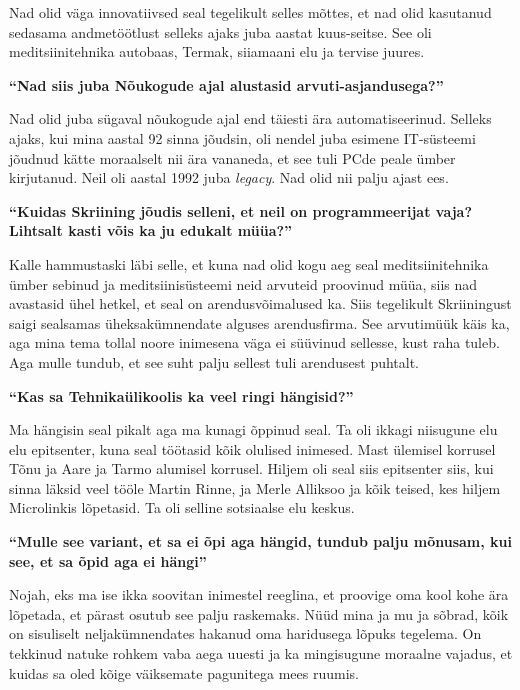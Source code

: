 Nad olid väga innovatiivsed seal tegelikult selles mõttes, et nad olid 
kasutanud sedasama andmetöötlust selleks ajaks juba aastat kuus-seitse. See oli 
 meditsiinitehnika autobaas, Termak, siiamaani elu ja tervise 
juures. 


\textbf{\enquote{Nad siis juba Nõukogude ajal alustasid arvuti-asjandusega?}}

Nad olid juba sügaval nõukogude ajal end täiesti ära automatiseerinud. Selleks 
ajaks, kui mina aastal 92 sinna jõudsin, oli nendel juba esimene IT-süsteemi 
jõudnud kätte moraalselt nii ära vananeda, et see tuli PCde peale ümber 
kirjutanud. Neil oli aastal 1992 juba \emph{legacy}. Nad olid nii palju ajast 
ees.


\textbf{\enquote{Kuidas Skriining jõudis selleni, et neil on programmeerijat 
vaja? Lihtsalt kasti võis ka ju edukalt müüa?}}

Kalle hammustaski läbi selle, et kuna nad olid kogu 
aeg seal meditsiinitehnika ümber sebinud ja meditsiinisüsteemi neid arvuteid 
proovinud müüa, siis nad avastasid ühel hetkel, et seal on arendusvõimalused 
ka. Siis tegelikult Skriiningust saigi sealsamas 
üheksakümnendate alguses  arendusfirma. See arvutimüük käis ka, aga mina tema 
tollal noore inimesena väga ei süüvinud sellesse, kust raha tuleb. Aga mulle 
tundub, et see suht palju sellest tuli arendusest puhtalt.


\textbf{\enquote{Kas sa Tehnikaülikoolis ka veel ringi hängisid?}}

Ma hängisin seal pikalt aga ma kunagi õppinud seal. Ta oli ikkagi niisugune elu 
elu epitsenter, kuna seal töötasid kõik olulised inimesed. 
Mast ülemisel korrusel Tõnu ja 
Aare ja Tarmo alumisel 
korrusel. Hiljem oli seal siis epitsenter siis, kui sinna läksid veel tööle 
Martin Rinne, ja Merle Alliksoo ja kõik teised, kes hiljem Microlinkis lõpetasid. Ta 
oli selline  sotsiaalse elu keskus. 

\textbf{\enquote{Mulle see variant, et sa ei õpi aga hängid, tundub palju 
mõnusam, kui see, et sa õpid aga ei hängi}}

Nojah, eks ma ise ikka soovitan inimestel reeglina, et  proovige oma kool kohe 
ära lõpetada, et pärast osutub see palju raskemaks. Nüüd mina ja mu ja sõbrad, 
kõik on sisuliselt neljakümnendates hakanud oma haridusega lõpuks tegelema. On 
tekkinud natuke rohkem vaba aega uuesti ja ka mingisugune moraalne vajadus, et 
kuidas sa oled kõige väiksemate pagunitega mees ruumis.

